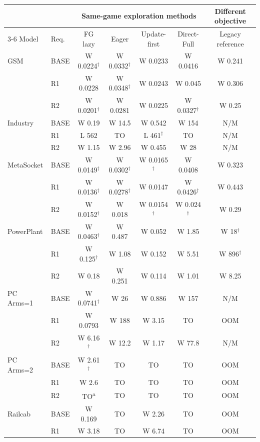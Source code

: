 \begingroup\scriptsize\setlength{\tabcolsep}{3pt}
\begin{tabular}{@{}llccccc@{}}
\toprule
 & & \multicolumn{4}{c}{Same-game exploration methods} & Different objective\\
\cmidrule(lr){3-6}
Model & Req. & FG lazy & Eager & Update-first & Direct-Full & Legacy reference\\
\midrule
GSM & BASE & W 0.0224$^{\dagger}$ & W 0.0332$^{\dagger}$ & W 0.0233 & W 0.0416 & W 0.241\\
 & R1 & W 0.0228 & W 0.0348$^{\dagger}$ & W 0.0243 & W 0.045 & W 0.306\\
 & R2 & W 0.0201$^{\dagger}$ & W 0.0281 & W 0.0225 & W 0.0327$^{\dagger}$ & W 0.25\\
\addlinespace[2pt]
Industry & BASE & W 0.19 & W 14.5 & W 0.542 & W 154 & N/M\\
 & R1 & L 562 & TO & L 461$^{\dagger}$ & TO & N/M\\
 & R2 & W 1.15 & W 2.96 & W 0.455 & W 28 & N/M\\
\addlinespace[2pt]
MetaSocket & BASE & W 0.0149$^{\dagger}$ & W 0.0302$^{\dagger}$ & W 0.0165$^{\dagger}$ & W 0.0408 & W 0.323\\
 & R1 & W 0.0136$^{\dagger}$ & W 0.0278$^{\dagger}$ & W 0.0147 & W 0.0426$^{\dagger}$ & W 0.443\\
 & R2 & W 0.0152$^{\dagger}$ & W 0.018 & W 0.0154$^{\dagger}$ & W 0.024$^{\dagger}$ & W 0.29\\
\addlinespace[2pt]
PowerPlant & BASE & W 0.0463$^{\dagger}$ & W 0.487 & W 0.052 & W 1.85 & W 18$^{\dagger}$\\
 & R1 & W 0.125$^{\dagger}$ & W 1.08 & W 0.152 & W 5.51 & W 896$^{\dagger}$\\
 & R2 & W 0.18 & W 0.251 & W 0.114 & W 1.01 & W 8.25\\
\addlinespace[2pt]
PC Arms=1 & BASE & W 0.0741$^{\dagger}$ & W 26 & W 0.886 & W 157 & N/M\\
 & R1 & W 0.0793 & W 188 & W 3.15 & TO & OOM\\
 & R2 & W 6.16$^{\dagger}$ & W 12.2 & W 1.17 & W 77.8 & N/M\\
\addlinespace[2pt]
PC Arms=2 & BASE & W 2.61$^{\dagger}$ & TO & TO & TO & OOM\\
 & R1 & W 2.6 & TO & TO & TO & OOM\\
 & R2 & TO\textsuperscript{a} & TO & TO & TO & OOM\\
\addlinespace[2pt]
Railcab & BASE & W 0.169 & TO & W 2.26 & TO & OOM\\
 & R1 & W 3.18 & TO & W 6.74 & TO & OOM\\

\end{tabular}
